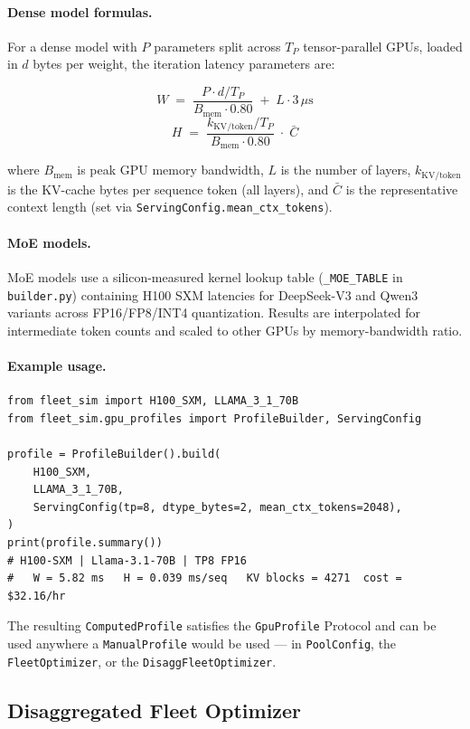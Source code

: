 \documentclass[11pt,a4paper]{article}
\begin{document}
\paragraph{Dense model formulas.}
For a dense model with $P$ parameters split across $T_P$ tensor-parallel
GPUs, loaded in $d$ bytes per weight, the iteration latency parameters are:

\[
  W \;=\; \frac{P \cdot d / T_P}{B_{\text{mem}} \cdot 0.80} \;+\;
          L \cdot 3\,\mu\text{s}
\]
\[
  H \;=\; \frac{k_{\text{KV/token}} / T_P}{B_{\text{mem}} \cdot 0.80}
          \;\cdot\; \bar{C}
\]

where $B_{\text{mem}}$ is peak GPU memory bandwidth, $L$ is the number of
layers, $k_{\text{KV/token}}$ is the KV-cache bytes per sequence token (all
layers), and $\bar{C}$ is the representative context length (set via
\texttt{ServingConfig.mean\_ctx\_tokens}).

\paragraph{MoE models.}
MoE models use a silicon-measured kernel lookup table (\texttt{\_MOE\_TABLE}
in \texttt{builder.py}) containing H100 SXM latencies for DeepSeek-V3 and
Qwen3 variants across FP16/FP8/INT4 quantization.  Results are
interpolated for intermediate token counts and scaled to other GPUs by
memory-bandwidth ratio.

\paragraph{Example usage.}

\begin{lstlisting}[style=python]
from fleet_sim import H100_SXM, LLAMA_3_1_70B
from fleet_sim.gpu_profiles import ProfileBuilder, ServingConfig

profile = ProfileBuilder().build(
    H100_SXM,
    LLAMA_3_1_70B,
    ServingConfig(tp=8, dtype_bytes=2, mean_ctx_tokens=2048),
)
print(profile.summary())
# H100-SXM | Llama-3.1-70B | TP8 FP16
#   W = 5.82 ms   H = 0.039 ms/seq   KV blocks = 4271  cost = $32.16/hr
\end{lstlisting}

The resulting \texttt{ComputedProfile} satisfies the \texttt{GpuProfile}
Protocol and can be used anywhere a \texttt{ManualProfile} would be
used --- in \texttt{PoolConfig}, the \texttt{FleetOptimizer}, or the
\texttt{DisaggFleetOptimizer}.

\subsection{Disaggregated Fleet Optimizer}
\label{sec:disagg-optimizer}
\end{document}
